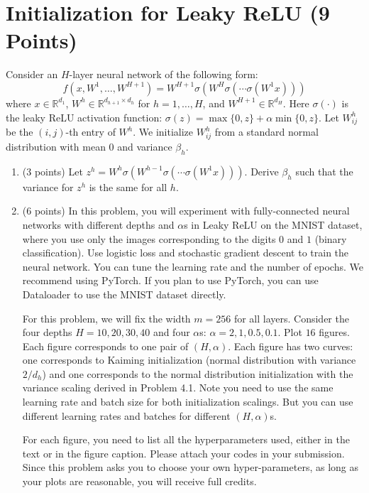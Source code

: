 \documentclass[11pt]{article}
\begin{document}
\section{Initialization for Leaky ReLU (9 Points)}
Consider an $H$-layer neural network of the following form: \[f(x,W^1,\ldots,W^{H+1}) = W^{H+1}\sigma(W^H\sigma(\cdots \sigma(W^1 x)))\] where $x \in \mathbb{R}^{d_1}$, $W^h \in \mathbb{R}^{d_{h+1} \times d_h}$ for $h=1,\ldots,H$, and $W^{H+1} \in \mathbb{R}^{d_{H}}$.
Here $\sigma(\cdot)$ is the leaky ReLU activation function: $\sigma(z) = \max\{0,z\} + \alpha \min\{0,z\}$. 
Let $W^{h}_{ij}$ be the $(i,j)$-th entry of $W^h$. We initialize $W^{h}_{ij}$ from a standard normal distribution with mean $0$ and variance $\beta_h$.
\begin{enumerate}
    \item (3 points) Let $z^h = W^h \sigma(W^{h-1}\sigma(\cdots \sigma(W^1 x)))$. Derive $\beta_h$ such that the variance for $z^h$ is the same for all $h$.
    \item (6 points) In this problem, you will experiment with fully-connected neural networks with different depths and $\alpha$s in Leaky ReLU on the MNIST dataset, where you use only the images corresponding to the digits $0$ and $1$ (binary classification).
    Use logistic loss and stochastic gradient descent to train the neural network. You can tune the learning rate and the number of epochs.
We recommend using PyTorch.
If you plan to use PyTorch, you can use Dataloader to use the MNIST dataset directly.

  For this problem, we will fix the width $m=256$ for all layers. Consider the four depths $H=10,20,30,40$ and four $\alpha$s: $\alpha = 2, 1,0.5,0.1$. Plot $16$ figures. Each figure corresponds to one pair of $(H,\alpha)$. Each figure has two curves: one corresponds to Kaiming initialization (normal distribution with variance $2/d_h$) and one corresponds to the normal distribution initialization with the variance scaling derived in Problem 4.1. Note you need to use the same learning rate and batch size for both initialization scalings. But you can use different learning rates and batches for different $(H,\alpha)$s.
  
  For each figure, you need to list all the hyperparameters used, either in the text or in the figure caption. Please attach your codes in your submission.
  Since this problem asks you to choose your own hyper-parameters, as long as your plots are reasonable, you will receive full credits.

    
\end{enumerate}

	
\end{document}

